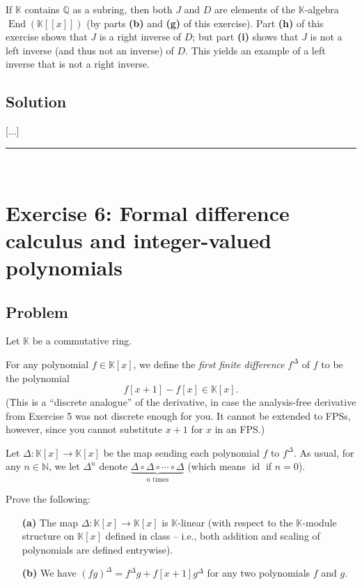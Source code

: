 \documentclass[paper=a4, fontsize=12pt]{scrartcl} %
\newcommand{\QQ}{\mathbb{Q}} %
\newcommand{\NN}{\mathbb{N}} %
\newcommand{\KK}{\mathbb{K}} %
\newcommand{\id}{\operatorname{id}} %
\newcommand{\End}{\operatorname{End}} %
\newcommand{\tup}[1]{\left( #1 \right)}
\newcommand{\ive}[1]{\left[ #1 \right]}
\newcommand{\ivee}[1]{\left[ \left[ #1 \right] \right]}
\newcommand{\horrule}[1]{\rule{\linewidth}{#1}} %
\theoremstyle{plainsl}
\theoremstyle{definition}
\theoremstyle{remark}
\begin{document}
If $\KK$ contains $\QQ$ as a subring, then both $J$ and $D$ are
elements of the $\KK$-algebra $\End \tup{\KK\ivee{x}}$
(by parts \textbf{(b)} and \textbf{(g)} of this exercise).
Part \textbf{(h)} of this exercise shows that $J$ is a right
inverse of $D$; but part \textbf{(i)} shows that $J$ is not a
left inverse (and thus not an inverse) of $D$.
This yields an example of a left inverse that is not a right
inverse.

\subsection{Solution}

[...]

\horrule{0.3pt} \\[0.4cm]

\section{Exercise 6: Formal difference calculus and integer-valued polynomials}

\subsection{Problem}

Let $\KK$ be a commutative ring.

For any polynomial $f \in \KK\ive{x}$,
we define the \textit{first finite difference} $f^\Delta$ of $f$
to be the polynomial
\[
f \ive{x+1} - f \ive{x} \in \KK\ive{x} .
\]
(This is a ``discrete analogue'' of the derivative,
in case the analysis-free derivative from Exercise 5
was not discrete enough for you.
It cannot be extended to FPSs, however, since you cannot
substitute $x+1$ for $x$ in an FPS.)

Let $\Delta : \KK\ive{x} \to \KK\ive{x}$ be the map sending
each polynomial $f$ to $f^\Delta$.
As usual, for any $n \in \NN$, we let $\Delta^n$ denote
$\underbrace{\Delta \circ \Delta \circ \cdots \circ \Delta}_{n \text{ times}}$
(which means $\id$ if $n = 0$).

Prove the following:

\begin{enumerate}

\item[\textbf{(a)}]
The map $\Delta : \KK\ive{x} \to \KK\ive{x}$ is $\KK$-linear
(with respect to the $\KK$-module structure on $\KK\ive{x}$
defined in class -- i.e., both addition and scaling of
polynomials are defined entrywise).

\item[\textbf{(b)}]
We have $\tup{fg}^\Delta = f^\Delta g + f\ive{x+1} g^\Delta$
for any two polynomials $f$ and $g$.

\end{enumerate}
\end{document}
